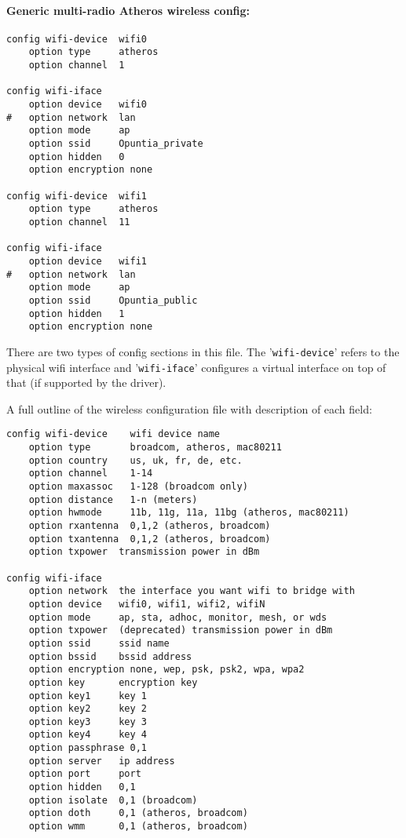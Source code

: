 \paragraph{Generic multi-radio Atheros wireless config:}

\begin{Verbatim}
config wifi-device  wifi0
    option type     atheros
    option channel  1

config wifi-iface
    option device   wifi0
#   option network  lan
    option mode     ap
    option ssid     Opuntia_private
    option hidden   0
    option encryption none

config wifi-device  wifi1
    option type     atheros
    option channel  11

config wifi-iface
    option device   wifi1
#   option network  lan
    option mode     ap
    option ssid     Opuntia_public
    option hidden   1
    option encryption none
\end{Verbatim}

There are two types of config sections in this file. The '\texttt{wifi-device}' refers to
the physical wifi interface and '\texttt{wifi-iface}' configures a virtual interface on top
of that (if supported by the driver).

A full outline of the wireless configuration file with description of each field:

\begin{Verbatim}
config wifi-device    wifi device name
    option type       broadcom, atheros, mac80211
    option country    us, uk, fr, de, etc.
    option channel    1-14
    option maxassoc   1-128 (broadcom only)
    option distance   1-n (meters)
    option hwmode     11b, 11g, 11a, 11bg (atheros, mac80211)
    option rxantenna  0,1,2 (atheros, broadcom)
    option txantenna  0,1,2 (atheros, broadcom)
    option txpower  transmission power in dBm

config wifi-iface
    option network  the interface you want wifi to bridge with
    option device   wifi0, wifi1, wifi2, wifiN
    option mode     ap, sta, adhoc, monitor, mesh, or wds
    option txpower  (deprecated) transmission power in dBm
    option ssid     ssid name
    option bssid    bssid address
    option encryption none, wep, psk, psk2, wpa, wpa2
    option key      encryption key
    option key1     key 1
    option key2     key 2
    option key3     key 3
    option key4     key 4
    option passphrase 0,1
    option server   ip address
    option port     port
    option hidden   0,1
    option isolate  0,1	(broadcom)
    option doth     0,1	(atheros, broadcom)
    option wmm      0,1	(atheros, broadcom)
\end{Verbatim}

